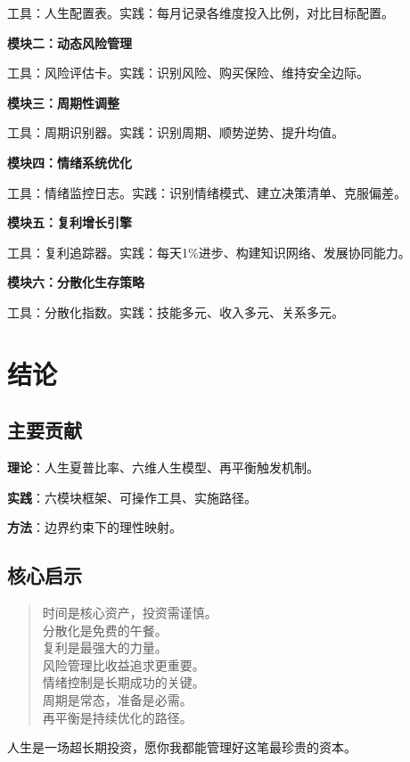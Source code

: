 \documentclass[12pt,a4paper]{article}
\begin{document}
工具：人生配置表。实践：每月记录各维度投入比例，对比目标配置。

\textbf{模块二：动态风险管理}

工具：风险评估卡。实践：识别风险、购买保险、维持安全边际。

\textbf{模块三：周期性调整}

工具：周期识别器。实践：识别周期、顺势逆势、提升均值。

\textbf{模块四：情绪系统优化}

工具：情绪监控日志。实践：识别情绪模式、建立决策清单、克服偏差。

\textbf{模块五：复利增长引擎}

工具：复利追踪器。实践：每天1\%进步、构建知识网络、发展协同能力。

\textbf{模块六：分散化生存策略}

工具：分散化指数。实践：技能多元、收入多元、关系多元。

\section{结论}

\subsection{主要贡献}

\textbf{理论}：人生夏普比率、六维人生模型、再平衡触发机制。

\textbf{实践}：六模块框架、可操作工具、实施路径。

\textbf{方法}：边界约束下的理性映射。

\subsection{核心启示}

\begin{quote}
时间是核心资产，投资需谨慎。\\
分散化是免费的午餐。\\
复利是最强大的力量。\\
风险管理比收益追求更重要。\\
情绪控制是长期成功的关键。\\
周期是常态，准备是必需。\\
再平衡是持续优化的路径。
\end{quote}

人生是一场超长期投资，愿你我都能管理好这笔最珍贵的资本。
\end{document}
